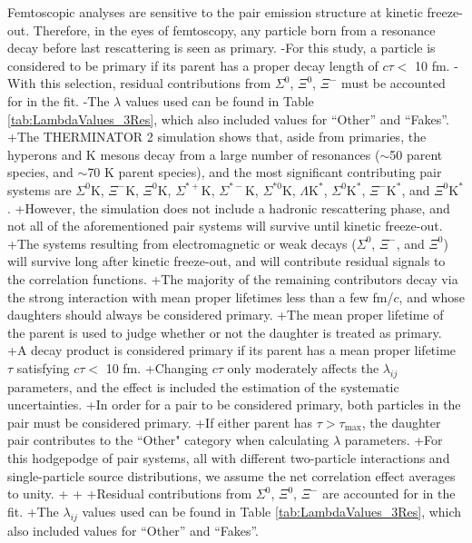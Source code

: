 \begin{table}[htbp]
\begin{table}[htbp]
 Femtoscopic analyses are sensitive to the pair emission structure at kinetic freeze-out.
 Therefore, in the eyes of femtoscopy, any particle born from a resonance decay before last rescattering is seen as primary.
-For this study, a particle is considered to be primary if its parent has a proper decay length of $c\tau <$ 10 fm. 
-With this selection, residual contributions from $\Sigma^{0}$, $\Xi^{0}$, $\Xi^{-}$ must be accounted for in the fit.
-The $\lambda$ values used can be found in Table \ref{tab:LambdaValues_3Res}, which also included values for ``Other'' and ``Fakes''.  
+The THERMINATOR 2 simulation shows that, aside from primaries, the \Lam hyperons and K mesons decay from a large number of resonances ($\sim$50 \Lam parent species, and $\sim$70 K parent species), and the most significant contributing pair systems are $\Sigma^{0}$K, $\Xi^{-}$K, $\Xi^{0}$K, $\Sigma^{*+}$K, $\Sigma^{*-}$K, $\Sigma^{*0}$K, $\Lambda\mathrm{K}^{*}$, $\Sigma^{0}\mathrm{K}^{*}$, $\Xi^{-}\mathrm{K}^{*}$, and $\Xi^{0}\mathrm{K}^{*}$.
+However, the simulation does not include a hadronic rescattering phase, and not all of the aforementioned pair systems will survive until kinetic freeze-out.
+The systems resulting from electromagnetic or weak decays ($\Sigma^{0}$, $\Xi^{-}$, and $\Xi^{0}$) will survive long after kinetic freeze-out, and will contribute residual signals to the \LamK correlation functions.
+The majority of the remaining contributors decay via the strong interaction with mean proper lifetimes less than a few fm/$c$, and whose daughters should always be considered primary.
+The mean proper lifetime of the parent is used to judge whether or not the daughter is treated as primary.
+A decay product is considered primary if its parent has a mean proper lifetime $\tau$ satisfying $c\tau <$ 10 fm.
+Changing $c\tau$ only moderately affects the $\lambda_{ij}$ parameters, and the effect is included the estimation of the systematic uncertainties.
+In order for a pair to be considered primary, both particles in the pair must be considered primary. 
+If either parent has $\tau > \tau_{\mathrm{max}}$, the daughter pair contributes to the ``Other" category when calculating $\lambda$ parameters.
+For this hodgepodge of pair systems, all with different two-particle interactions and single-particle source distributions, we assume the net correlation effect averages to unity.
+
+
+Residual contributions from $\Sigma^{0}$, $\Xi^{0}$, $\Xi^{-}$ are accounted for in the fit.
+The $\lambda_{ij}$ values used can be found in Table \ref{tab:LambdaValues_3Res}, which also included values for ``Other'' and ``Fakes''.  

\end{table}
\end{table}
